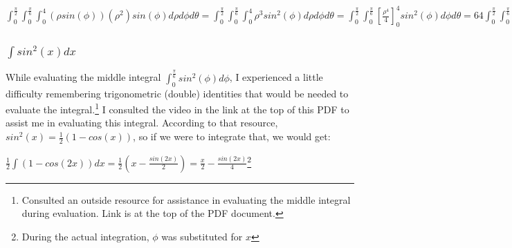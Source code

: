 \documentclass{article}
\begin{document}
\par\noindent\Large $\int_{0}^{\frac{\pi}{2}}\int_{0}^{\frac{\pi}{6}}\int_{0}^{4}(\rho sin(\phi))(\rho^{2})sin(\phi)d\rho d\phi d\theta = \int_{0}^{\frac{\pi}{2}}\int_{0}^{\frac{\pi}{6}}\int_{0}^{4}\rho^{3}sin^{2}(\phi)d\rho d\phi d\theta = \int_{0}^{\frac{\pi}{2}}\int_{0}^{\frac{\pi}{6}}[\frac{\rho^{4}}{4}]_{0}^{4}sin^{2}(\phi)d\phi d\theta = 64\int_{0}^{\frac{\pi}{2}}\int_{0}^{\frac{\pi}{6}}sin^{2}(\phi) d\phi d\theta = 64\int_{0}^{\frac{\pi}{2}}\int_{0}^{\frac{\pi}{6}}(sin(\phi))^{2} d\phi d\theta = 64\int_{0}^{\frac{\pi}{2}}[\frac{\phi}{2} - \frac{sin(2\phi)}{4}]_{0}^{\frac{\pi}{6}}d\theta = 64\int_{0}^{\frac{\pi}{2}}[\frac{\pi}{12} - \frac{sin(\frac{\pi}{3})}{4}]d\theta = 64\int_{0}^{\frac{\pi}{2}}[\frac{\pi}{12} - \frac{\sqrt{3}}{8}]d\theta = 64[\frac{\pi}{12} - \frac{\sqrt{3}}{8}][\theta]_{0}^{\frac{\pi}{2}} = 64[\frac{\pi}{12} - \frac{\sqrt{3}}{8}][\frac{\pi}{2}] \approx 4.55$

\subsubsection{$\int sin^{2}(x)dx$}
\par\noindent\large While evaluating the middle integral $\int_{0}^{\frac{\pi}{6}}sin^{2}(\phi)d\phi$, I experienced a little difficulty remembering trigonometric (double) identities that would be needed to evaluate the integral.\footnote{Consulted an outside resource for assistance in evaluating the middle integral during evaluation.  Link is at the top of the PDF document.}  I consulted the video in the link at the top of this PDF to assist me in evaluating this integral.  According to that resource, $sin^{2}(x) = \frac{1}{2}(1 - cos(x))$, so if we were to integrate that, we would get:
\par\noindent\Large $\frac{1}{2}\int (1 - cos(2x)) dx = \frac{1}{2}(x - \frac{sin(2x)}{2}) = \frac{x}{2} - \frac{sin(2x)}{4}$\footnote{During the actual integration, $\phi$ was substituted for $x$}
\end{document}
